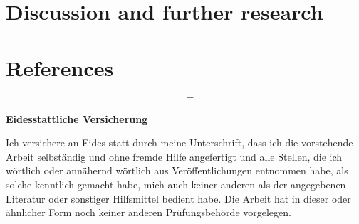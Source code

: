 \documentclass[12pt,a4paper]{article}
\begin{document}
\hypertarget{discussion-and-further-research}{%
\section{Discussion and further
research}\label{discussion-and-further-research}}

\hypertarget{references}{%
\section{References}\label{references}}

\begin{align*}
  \quad - 
\end{align*}

\newpage
\textbf{Eidesstattliche Versicherung}

\bigskip

Ich versichere an Eides statt durch meine Unterschrift, dass ich die vorstehende Arbeit selbständig und ohne fremde Hilfe angefertigt und alle Stellen, die ich wörtlich oder annähernd wörtlich aus Veröffentlichungen entnommen habe, als solche kenntlich gemacht habe, mich auch keiner anderen als der angegebenen Literatur oder sonstiger Hilfsmittel bedient habe. Die Arbeit hat in dieser oder ähnlicher Form noch keiner anderen Prüfungsbehörde vorgelegen.

\vspace{1cm}
\rule{0pt}{2\baselineskip} %
\par\noindent{} \hfill\makebox[2.25in]{\hrulefill}%
\par\noindent\makebox[2.25in][l]{} \hfill{}%
\end{document}

